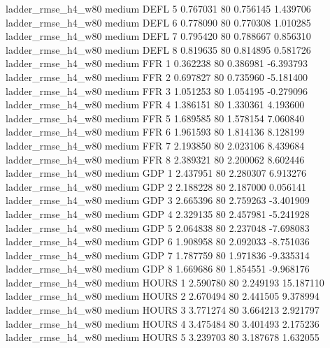  ladder_rmse_h4_w80     medium     DEFL                 5  0.767031 80       0.756145           1.439706
 ladder_rmse_h4_w80     medium     DEFL                 6  0.778090 80       0.770308           1.010285
 ladder_rmse_h4_w80     medium     DEFL                 7  0.795420 80       0.788667           0.856310
 ladder_rmse_h4_w80     medium     DEFL                 8  0.819635 80       0.814895           0.581726
 ladder_rmse_h4_w80     medium      FFR                 1  0.362238 80       0.386981          -6.393793
 ladder_rmse_h4_w80     medium      FFR                 2  0.697827 80       0.735960          -5.181400
 ladder_rmse_h4_w80     medium      FFR                 3  1.051253 80       1.054195          -0.279096
 ladder_rmse_h4_w80     medium      FFR                 4  1.386151 80       1.330361           4.193600
 ladder_rmse_h4_w80     medium      FFR                 5  1.689585 80       1.578154           7.060840
 ladder_rmse_h4_w80     medium      FFR                 6  1.961593 80       1.814136           8.128199
 ladder_rmse_h4_w80     medium      FFR                 7  2.193850 80       2.023106           8.439684
 ladder_rmse_h4_w80     medium      FFR                 8  2.389321 80       2.200062           8.602446
 ladder_rmse_h4_w80     medium      GDP                 1  2.437951 80       2.280307           6.913276
 ladder_rmse_h4_w80     medium      GDP                 2  2.188228 80       2.187000           0.056141
 ladder_rmse_h4_w80     medium      GDP                 3  2.665396 80       2.759263          -3.401909
 ladder_rmse_h4_w80     medium      GDP                 4  2.329135 80       2.457981          -5.241928
 ladder_rmse_h4_w80     medium      GDP                 5  2.064838 80       2.237048          -7.698083
 ladder_rmse_h4_w80     medium      GDP                 6  1.908958 80       2.092033          -8.751036
 ladder_rmse_h4_w80     medium      GDP                 7  1.787759 80       1.971836          -9.335314
 ladder_rmse_h4_w80     medium      GDP                 8  1.669686 80       1.854551          -9.968176
 ladder_rmse_h4_w80     medium    HOURS                 1  2.590780 80       2.249193          15.187110
 ladder_rmse_h4_w80     medium    HOURS                 2  2.670494 80       2.441505           9.378994
 ladder_rmse_h4_w80     medium    HOURS                 3  3.771274 80       3.664213           2.921797
 ladder_rmse_h4_w80     medium    HOURS                 4  3.475484 80       3.401493           2.175236
 ladder_rmse_h4_w80     medium    HOURS                 5  3.239703 80       3.187678           1.632055
